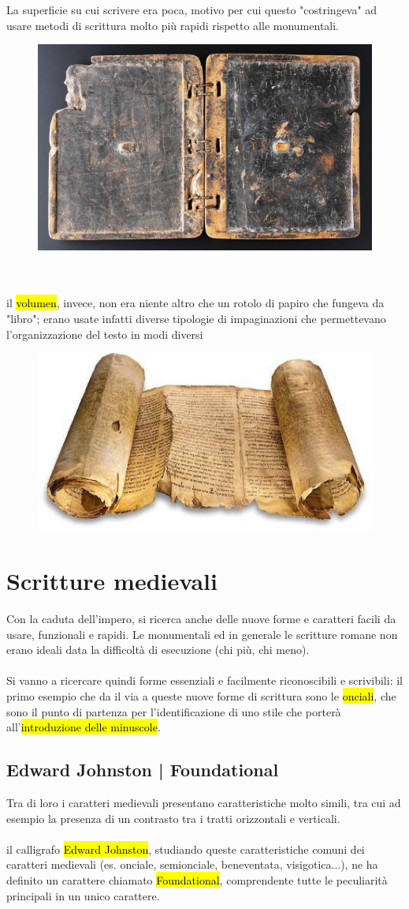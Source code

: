 La superficie su cui scrivere era poca, motivo per cui questo "costringeva" ad usare metodi di scrittura molto più rapidi rispetto alle monumentali.
\begin{figure}[H]
    \centering
    \includegraphics[width=0.3\linewidth]{blocco_3 - storia della scrittura/imgs/varivs_scriptio20b.jpg}
\end{figure}
\\\\
il \hl{volumen}, invece, non era niente altro che un rotolo di papiro che fungeva da "libro"; erano usate infatti diverse tipologie di impaginazioni che permettevano l'organizzazione del testo in modi diversi
\begin{figure}[H]
    \centering
    \includegraphics[width=0.3\linewidth]{blocco_3 - storia della scrittura/imgs/17495684_10209129661334783_1817188107_n-1.jpg}
\end{figure}
\section{Scritture medievali}
Con la caduta dell'impero, si ricerca anche delle nuove forme e caratteri facili da usare, funzionali e rapidi. Le monumentali ed in generale le scritture romane non erano ideali data la difficoltà di esecuzione (chi più, chi meno).
\\\\
Si vanno a ricercare quindi forme essenziali e facilmente riconoscibili e scrivibili: il primo esempio che da il via a queste nuove forme di scrittura sono le \hl{onciali}, che sono il punto di partenza per l'identificazione di uno stile che porterà all'\hl{introduzione delle minuscole}.

\subsection{Edward Johnston | Foundational}
Tra di loro i caratteri medievali presentano caratteristiche molto simili, tra cui ad esempio la presenza di un contrasto tra i tratti orizzontali e verticali.
\\\\
il calligrafo \hl{Edward Johnston}, studiando queste caratteristiche comuni dei caratteri medievali (es. onciale, semionciale, beneventata, visigotica...), ne ha definito un carattere chiamato \hl{Foundational}, comprendente tutte le peculiarità principali in un unico carattere.
